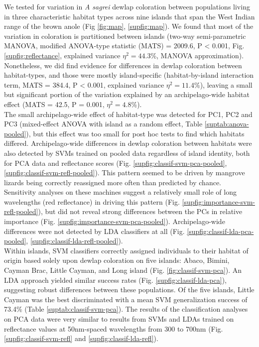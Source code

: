 
We tested for variation in \textit{A sagrei} dewlap coloration between populations living in three characteristic habitat types across nine islands that span the West Indian range of the brown anole (Fig \ref{fig:map}, \ref{supfig:map}). We found that most of the variation in coloration is partitioned between islands (two-way semi-parametric MANOVA, modified ANOVA-type statistic (MATS) = 2009.6, P < 0.001, Fig. \ref{supfig:reflectance}, explained variance $\eta^2 = 44.3$\%, MANOVA approximation). Nonetheless, we did find evidence for differences in dewlap coloration between habitat-types, and those were mostly island-specific (habitat-by-island interaction term, MATS = 384.4, P < 0.001, explained variance $\eta^2 = 11.4$\%), leaving a small but significant portion of the variation explained by an archipelago-wide habitat effect (MATS = 42.5, P = 0.001, $\eta^2 = 4.8$\%).\\

The small archipelago-wide effect of habitat-type was detected for PC1, PC2 and PC3 (mixed-effect ANOVA with island as a random effect, Table \ref{suptab:anova-pooled}), but this effect was too small for post hoc tests to find which habitats differed. Archipelago-wide differences in dewlap coloration between habitats were also detected by SVMs trained on pooled data regardless of island identity, both for PCA data and reflectance scores (Fig. \ref{supfig:classif-svm-pca-pooled}, \ref{supfig:classif-svm-refl-pooled}). This pattern seemed to be driven by mangrove lizards being correctly reassigned more often than predicted by chance. Sensitivity analyses on these machines suggest a relatively small role of long wavelengths (red reflectance) in driving this pattern (Fig. \ref{supfig:importance-svm-refl-pooled}), but did not reveal strong differences between the PCs in relative importance (Fig. \ref{supfig:importance-svm-pca-pooled}).  Archipelago-wide differences were not detected by LDA classifiers at all (Fig. \ref{supfig:classif-lda-pca-pooled}, \ref{supfig:classif-lda-refl-pooled}).\\ %

Within islands, SVM classifiers correctly assigned individuals to their habitat of origin based solely upon dewlap coloration on five islands: Abaco, Bimini, Cayman Brac, Little Cayman, and Long island (Fig. \ref{fig:classif-svm-pca}). An LDA approach yielded similar success rates (Fig. \ref{supfig:classif-lda-pca}), suggesting robust differences between these populations. Of the five islands, Little Cayman was the best discriminated with a mean SVM generalization success of 73.4\% (Table \ref{suptab:classif-svm-pca}). The results of the classification analyses on PCA data were very similar to results from SVMs and LDAs trained on reflectance values at 50nm-spaced wavelengths from 300 to 700nm (Fig. \ref{supfig:classif-svm-refl} and \ref{supfig:classif-lda-refl}).\\

